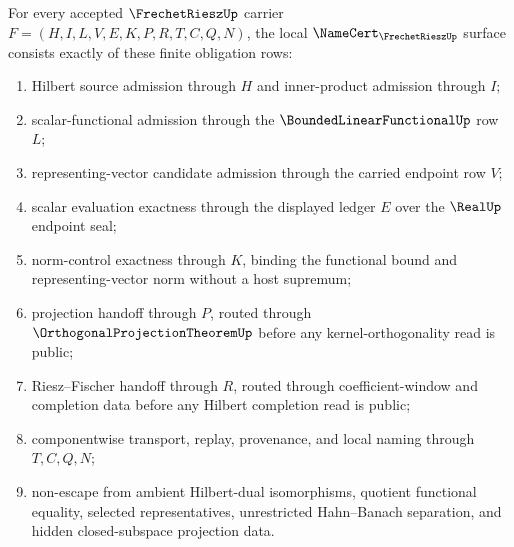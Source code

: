 
\begin{theorem}
\label{thm:frechet-riesz-namecert-obligations}
For every accepted $\FrechetRieszUp$ carrier $F=(H,I,L,V,E,K,P,R,T,C,Q,N)$, the local $\NameCert_{\FrechetRieszUp}$ surface consists exactly of these finite obligation rows:
\begin{enumerate}
\item Hilbert source admission through $H$ and inner-product admission through $I$;
\item scalar-functional admission through the $\BoundedLinearFunctionalUp$ row $L$;
\item representing-vector candidate admission through the carried endpoint row $V$;
\item scalar evaluation exactness through the displayed ledger $E$ over the $\RealUp$ endpoint seal;
\item norm-control exactness through $K$, binding the functional bound and representing-vector norm without a host supremum;
\item projection handoff through $P$, routed through $\OrthogonalProjectionTheoremUp$ before any kernel-orthogonality read is public;
\item Riesz--Fischer handoff through $R$, routed through coefficient-window and completion data before any Hilbert completion read is public;
\item componentwise transport, replay, provenance, and local naming through $T,C,Q,N$;
\item non-escape from ambient Hilbert-dual isomorphisms, quotient functional equality, selected representatives, unrestricted Hahn--Banach separation, and hidden closed-subspace projection data.
\end{enumerate}
\end{theorem}
